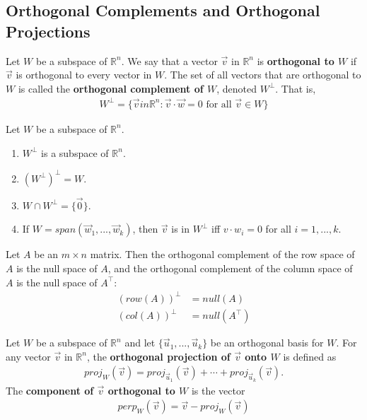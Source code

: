 \documentclass{article}
\begin{document}
\subsection{Orthogonal Complements and Orthogonal Projections}
\begin{definition}
	Let $W$ be a subspace of $\mathbb{R}^n$. We say that a vector $\vec v$ in $\mathbb{R}^n$ is \textbf{orthogonal to $W$} if $\vec v$ is orthogonal to every vector in $W$. The set of all vectors that are orthogonal to $W$ is called the \textbf{orthogonal complement of $W$}, denoted $W^{\perp}$. That is,
	\begin{align*}
		W^{\perp} = \{\vec v in \mathbb{R}^n:\vec v \cdot \vec w = 0 \text{ for all }\vec v\in W\}
	\end{align*}
\end{definition}
\begin{theorem}
	Let $W$ be a subspace of $\mathbb{R}^n$.
	\begin{enumerate}
		\item $W^{\perp}$ is a subspace of $\mathbb{R}^n$.
		\item $\left(W^{\perp}\right)^{\perp}=W$.
		\item $W\cap W^{\perp}=\{\vec 0\}$.
		\item If $W=span({\vec w_1, ..., \vec w_k})$, then $\vec v$ is in $W^{\perp}$ iff $v\cdot w_i=0$ for all $i=1,...,k$.
	\end{enumerate}
\end{theorem}
\begin{theorem}
	Let $A$ be an $m\times n$ matrix. Then the orthogonal complement of the row space of $A$ is the null space of $A$, and the orthogonal complement of the column space of $A$ is the null space of $A^\intercal $:
	\begin{align*}
		(row(A))^{\perp} & =null(A)            \\
		(col(A))^{\perp} & =null(A^\intercal )
	\end{align*}
\end{theorem}
\begin{definition}
	Let $W$ be a subspace of $\mathbb{R}^n$ and let $\{\vec u_1, ..., \vec u_k\}$ be an orthogonal basis for $W$.
	For any vector $\vec v$ in $\mathbb{R}^n$, the \textbf{orthogonal projection of $\vec v$ onto $W$} is defined as
	\begin{align*}
		proj_W(\vec v)=proj_{\vec u_1}(\vec v) + \cdots + proj_{\vec u_k}(\vec v).
	\end{align*}
	The \textbf{component of $\vec v$ orthogonal to $W$} is the vector
	\begin{align*}
		perp_W(\vec v) = \vec v - proj_W(\vec v)
	\end{align*}
\end{definition}
\end{document}
